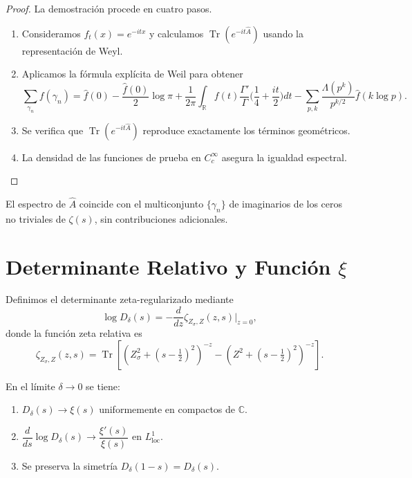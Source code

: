 \begin{proof}
La demostración procede en cuatro pasos.
\begin{enumerate}
  \item Consideramos $f_t(x) = e^{-itx}$ y calculamos $\operatorname{Tr}(e^{-it \widehat{A}})$ usando la representación de Weyl.
  \item Aplicamos la fórmula explícita de Weil para obtener
  \[
    \sum_{\gamma_n} f(\gamma_n) = \widehat{f}(0) - \frac{\widehat{f}(0)}{2}\log \pi + \frac{1}{2\pi}\int_{\mathbb{R}} f(t) \frac{\Gamma'}{\Gamma}\Big(\frac{1}{4} + \frac{it}{2}\Big) dt - \sum_{p,k} \frac{\Lambda(p^k)}{p^{k/2}}\widehat{f}(k \log p).
  \]
  \item Se verifica que $\operatorname{Tr}(e^{-it \widehat{A}})$ reproduce exactamente los términos geométricos.
  \item La densidad de las funciones de prueba en $C_c^\infty$ asegura la igualdad espectral.
\end{enumerate}
\end{proof}

\begin{corollary}\label{cor:correspondencia-espectral-latex}
El espectro de $\widehat{A}$ coincide con el multiconjunto $\{\gamma_n\}$ de imaginarios de los ceros no triviales de $\zeta(s)$, sin contribuciones adicionales.
\end{corollary}

\section{Determinante Relativo y Función $\xi$}

Definimos el determinante zeta-regularizado mediante
\[
  \log D_\delta(s) = -\frac{d}{dz} \zeta_{Z_\sigma, Z}(z,s) \big|_{z=0},
\]
donde la función zeta relativa es
\[
  \zeta_{Z_\sigma, Z}(z,s) = \operatorname{Tr}\left[(Z_\sigma^2 + (s-\tfrac{1}{2})^2)^{-z} - (Z^2 + (s-\tfrac{1}{2})^2)^{-z}\right].
\]

\begin{theorem}\label{thm:determinante-latex}
En el límite $\delta \to 0$ se tiene:
\begin{enumerate}
  \item $D_\delta(s) \to \xi(s)$ uniformemente en compactos de $\mathbb{C}$.
  \item $\dfrac{d}{ds} \log D_\delta(s) \to \dfrac{\xi'(s)}{\xi(s)}$ en $L^1_{\text{loc}}$.
  \item Se preserva la simetría $D_\delta(1-s) = D_\delta(s)$.
\end{enumerate}
\end{theorem}

